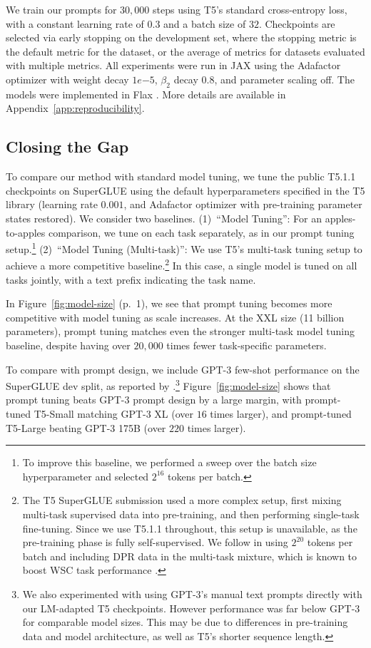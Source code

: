 We train our prompts for $30{,}000$ steps using T5's standard cross-entropy loss, with a constant learning rate of $0.3$ and a batch size of $32$. Checkpoints are selected via early stopping on the development set, where the stopping metric is the default metric for the dataset, or the average of metrics for datasets evaluated with multiple metrics. All experiments were run in JAX \cite{jax2018github} using the Adafactor optimizer \cite{pmlr-v80-shazeer18a} with weight decay $1e{-5}$, $\beta_2$ decay $0.8$, and parameter scaling off. The models were implemented in Flax \cite{flax2020github}. More details are available in Appendix~\ref{app:reproducibility}.

\subsection{Closing the Gap}

To compare our method with standard model tuning, we tune the public T5.1.1 checkpoints on SuperGLUE using the default hyperparameters specified in the T5 library (learning rate $0.001$, and Adafactor optimizer with pre-training parameter states restored). We consider two baselines. (1)~``Model Tuning'': For an apples-to-apples comparison, we tune on each task separately, as in our prompt tuning setup.\footnote{To improve this baseline, we performed a sweep over the batch size hyperparameter and selected $2^{16}$ tokens per batch.} (2)~``Model Tuning (Multi-task)'': We use T5's multi-task tuning setup to achieve a more competitive baseline.\footnote{The T5 SuperGLUE submission used a more complex setup, first mixing multi-task supervised data into pre-training, and then performing single-task fine-tuning. Since we use T5.1.1 throughout, this setup is unavailable, as the pre-training phase is fully self-supervised. We follow \citet{raffel_2020_t5} in using $2^{20}$ tokens per batch and including DPR data in the multi-task mixture, which is known to boost WSC task performance \cite{kocijan-etal-2019-surprisingly}.} In this case, a single model is tuned on all tasks jointly, with a text prefix indicating the task name.

In Figure~\ref{fig:model-size} (p.~1), we see that prompt tuning becomes more competitive with model tuning as scale increases. At the XXL size (11 billion parameters), prompt tuning matches even the stronger multi-task model tuning baseline, despite having over $20{,}000$ times fewer task-specific parameters.

To compare with prompt design, we include GPT-3 few-shot performance on the SuperGLUE dev split, as reported by \citet{brown_2020_gpt3}.\footnote{We also experimented with using GPT-3's manual text prompts directly with our LM-adapted T5 checkpoints. However performance was far below GPT-3 for comparable model sizes. This may be due to differences in pre-training data and model architecture, as well as T5's shorter sequence length.} Figure~\ref{fig:model-size} shows that prompt tuning beats \mbox{GPT-3} prompt design by a large margin, with prompt-tuned \mbox{T5-Small} matching \mbox{GPT-3} XL (over $16$ times larger), and prompt-tuned \mbox{T5-Large} beating \mbox{GPT-3} 175B (over $220$ times larger).


